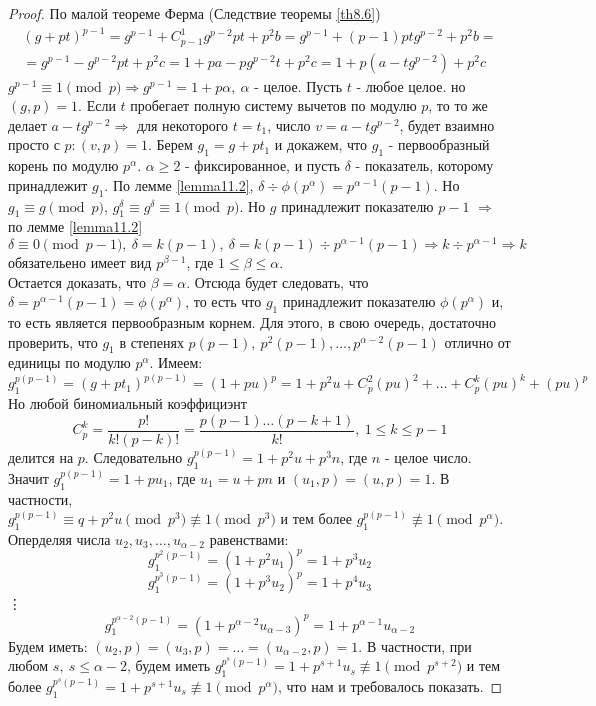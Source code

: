     \begin{proof}
        По малой теореме Ферма (Следствие теоремы \ref{th8.6})
        \begin{multline*}
            (g+pt)^{p-1}=g^{p-1}+C_{p-1}^1 g^{p-2} pt+p^2 b=g^{p-1}+(p-1)ptg^{p-2}+p^2b=\\
            =g^{p-1}-g^{p-2}pt+p^2c=1+pa-pg^{p-2}t+p^2c=1+p(a-tg^{p-2})+p^2c     
        \end{multline*}
        $g^{p-1}\equiv 1\pmod{p} \Rightarrow g^{p-1}=1+p\alpha,\ \alpha$ - целое. Пусть $t$ - любое целое.
        но $(g,p)=1$. Если $t$ пробегает полную систему вычетов по модулю $p$, то то же делает $a-tg^{p-2} \Rightarrow$ для некоторого $t=t_1$, число $v=a-tg^{p-2}$, будет взаимно просто с $p:(v,p)=1$. Берем $g_1=g+pt_1$ и докажем, что $g_1$ - первообразный корень по модулю $p^{\alpha}$. $\alpha\geq 2$ - фиксированное, и пусть $\delta$ - показатель, которому принадлежит $g_1$. По лемме \ref{lemma11.2}, $\delta \div \phi(p^{\alpha})=p^{\alpha-1}(p-1)$. Но $g_1\equiv g\pmod{p}$, $g_1^{\delta}\equiv g^{\delta}\equiv 1\pmod{p}$. Но $g$ принадлежит показателю $p-1$ $\Rightarrow$ по лемме \ref{lemma11.2} $\delta \equiv 0 \pmod{p-1},\ \delta=k(p-1),\ \delta=k(p-1) \div p^{\alpha-1}(p-1) \Rightarrow k\div p^{\alpha-1} \Rightarrow k$ обязательено имеет вид $p^{\beta-1}$, где $1\leq \beta\leq \alpha$.\\
        Остается доказать, что $\beta=\alpha$. Отсюда будет следовать, что\\
        $\delta = p^{\alpha-1}(p-1)=\phi(p^{\alpha})$, то есть что $g_1$ принадлежит показателю $\phi(p^{\alpha})$ и, то есть является первообразным корнем. Для этого, в свою очередь, достаточно проверить, что $g_1$ в степенях $p(p-1),\ p^2(p-1),\dots, p^{\alpha-2}(p-1)$ отлично от единицы по модулю $p^{\alpha}$. Имеем:
        \[g_1^{p(p-1)}=(g+pt_1)^{p(p-1)}=(1+pu)^p=1+p^2 u+C_p^2 (pu)^2+\dots+C_p^k (pu)^k+(pu)^p\]
        Но любой биномиальный коэффициэнт
        \[C_p^k=\frac{p!}{k! (p-k)!}=\frac{p(p-1)\dots(p-k+1)}{k!},\ 1\leq k\leq p-1\]
        делится на $p$. Следовательно $g_1^{p(p-1)}=1+p^2u+p^3n$, где $n$ - целое число. Значит $g_1^{p(p-1)}=1+pu_1$, где $u_1=u+pn$ и $(u_1, p)=(u, p)=1$.
        В частности,\\
        $g_1^{p(p-1)}\equiv q+p^2 u\pmod{p^3}\not\equiv 1\pmod{p^3}$ и тем более $g_1^{p(p-1)}\not\equiv 1\pmod{p^{\alpha}}$. Оперделяя числа $u_2, u_3, \dots, u_{\alpha-2}$ равенствами:
        \[g_1^{p^2(p-1)}=(1+p^2 u_1)^p=1+p^3 u_2\]
        \[g_1^{p^3(p-1)}=(1+p^3 u_2)^p=1+p^4 u_3\]
        \tab[8cm] \vdots
        \[g_1^{p^{\alpha-2}(p-1)}=(1+p^{\alpha-2}u_{\alpha-3})^p=1+p^{\alpha-1} u_{\alpha-2}\]
        Будем иметь: $(u_2, p)=(u_3, p) = \dots = (u_{\alpha-2}, p)=1$. В частности, при любом $s,\ s\leq \alpha-2$, будем иметь $g_1^{p^s (p-1)}=1+p^{s+1}u_s\not\equiv 1 \pmod{p^{s+2}}$ и тем более $g_1^{p^s(p-1)}=1+p^{s+1} u_s \not\equiv 1 \pmod{p^{\alpha}}$, что нам и требовалось показать.
    \end{proof}
